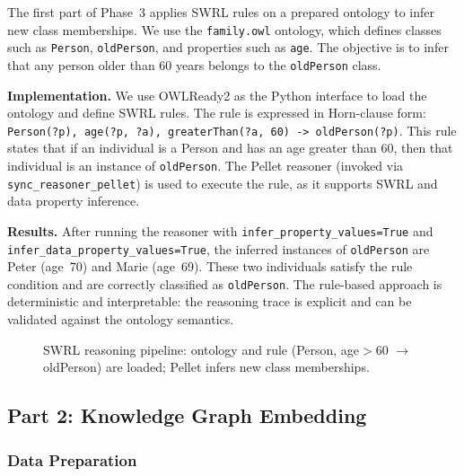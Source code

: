 \documentclass[11pt,a4paper]{article}
\begin{document}
  The first part of Phase~3 applies SWRL rules on a prepared ontology to infer new class memberships. We use the \texttt{family.owl} ontology, which defines classes such as \texttt{Person}, \texttt{oldPerson}, and properties such as \texttt{age}. The objective is to infer that any person older than 60 years belongs to the \texttt{oldPerson} class.

  \textbf{Implementation.} We use OWLReady2 as the Python interface to load the ontology and define SWRL rules. The rule is expressed in Horn-clause form: \texttt{Person(?p), age(?p, ?a), greaterThan(?a, 60) -> oldPerson(?p)}. This rule states that if an individual is a Person and has an age greater than 60, then that individual is an instance of \texttt{oldPerson}. The Pellet reasoner (invoked via \texttt{sync\_reasoner\_pellet}) is used to execute the rule, as it supports SWRL and data property inference.

  \textbf{Results.} After running the reasoner with \texttt{infer\_property\_values=True} and \texttt{infer\_data\_property\_values=True}, the inferred instances of \texttt{oldPerson} are Peter (age~70) and Marie (age~69). These two individuals satisfy the rule condition and are correctly classified as \texttt{oldPerson}. The rule-based approach is deterministic and interpretable: the reasoning trace is explicit and can be validated against the ontology semantics.

  \begin{figure}[ht]
  \centering
  \caption{SWRL reasoning pipeline: ontology and rule (Person, age$>$60 $\rightarrow$ oldPerson) are loaded; Pellet infers new class memberships.}
  \end{figure}

  \subsection{Part 2: Knowledge Graph Embedding}

  \subsubsection{Data Preparation}
\end{document}
